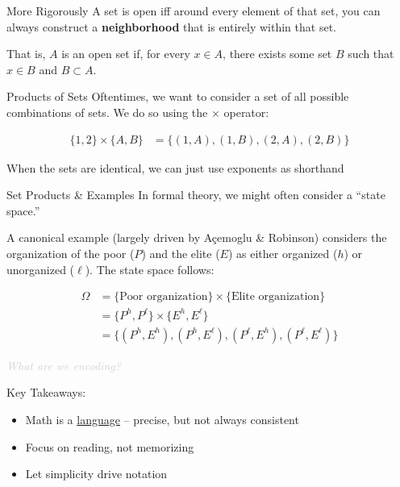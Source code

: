 \documentclass[10pt]{beamer}
\begin{document}
\begin{frame}{More Rigorously}
A set is open iff around every element of that set, you can always construct a \textbf{neighborhood} that is entirely within that set. 

That is, $A$ is an open set if, for every $x \in A$, there exists some set $B$ such that $x \in B$ and $B \subset A$. 
\end{frame}


\begin{frame}{Products of Sets}
    Oftentimes, we want to consider a set of all possible combinations of sets. We do so using the $\times$ operator:

    \begin{align*}
        \{1,2\} \times \{A,B\} &= \{(1,A),(1,B),(2,A),(2,B)\}
    \end{align*}

    When the sets are identical, we can just use exponents as shorthand
\end{frame}

\begin{frame}{Set Products \& Examples}
    In formal theory, we might often consider a ``state space.''

    A canonical example (largely driven by Açemoglu \& Robinson) considers the organization of the poor ($P$) and the elite ($E$) as either organized ($h$) or unorganized ($\ell$). The state space follows:

    \begin{align*}
        \Omega &= \{\text{Poor organization}\} \times \{\text{Elite organization}\} \\
        &= \{P^h, P^\ell\} \times \{E^h, E^\ell\} \\
        &= \{(P^h, E^h),(P^h,E^\ell),(P^\ell,E^h),(P^\ell,E^\ell)\}
    \end{align*}

    \emph{\textcolor{lightgray}{What are we encoding?}}
\end{frame}


\begin{frame}{Key Takeaways:}

\begin{itemize}
    \item Math is a \underline{language} -- precise, but not always consistent
    \item Focus on reading, not memorizing
    \item Let simplicity drive notation
\end{itemize}

\end{frame}
\end{document}
